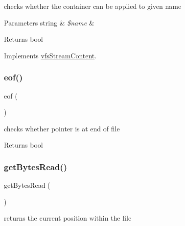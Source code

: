 checks whether the container can be applied to given name


\begin{DoxyParams}[1]{Parameters}
string & {\em \$name} & \\
\hline
\end{DoxyParams}
\begin{DoxyReturn}{Returns}
bool 
\end{DoxyReturn}


Implements \mbox{\hyperlink{interfaceorg_1_1bovigo_1_1vfs_1_1vfs_stream_content_a1769b12aee6e9730bcf9b56703eb6a03}{vfs\+Stream\+Content}}.

\mbox{\label{classorg_1_1bovigo_1_1vfs_1_1vfs_stream_file_ada3799f740f09e3689d0054629e87feb}} 
\subsubsection{\texorpdfstring{eof()}{eof()}}
{\footnotesize\ttfamily eof (\begin{DoxyParamCaption}{ }\end{DoxyParamCaption})}

checks whether pointer is at end of file

\begin{DoxyReturn}{Returns}
bool 
\end{DoxyReturn}
\mbox{\label{classorg_1_1bovigo_1_1vfs_1_1vfs_stream_file_aa05e9588ede58b8e3b6b82a684a0337b}} 
\subsubsection{\texorpdfstring{get\+Bytes\+Read()}{getBytesRead()}}
{\footnotesize\ttfamily get\+Bytes\+Read (\begin{DoxyParamCaption}{ }\end{DoxyParamCaption})}

returns the current position within the file


